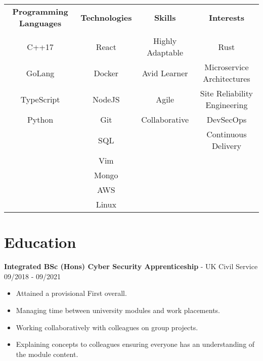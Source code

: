 \documentclass{article}
\begin{document}
\begin{center}
\begin{tabular}{ c | c | c | c } 
	\textbf{Programming Languages} & \textbf{Technologies} & \textbf{Skills}  & \textbf{Interests}           \\

	                               &                       &                  &                              \\
	C++17                          & React                 & Highly Adaptable & Rust                         \\
	GoLang                         & Docker                & Avid Learner     & Microservice Architectures   \\
	TypeScript                     & NodeJS                & Agile            & Site Reliability Engineering \\
	Python                         & Git                   & Collaborative    & DevSecOps                    \\
	                               & SQL                   &                  & Continuous Delivery          \\
	                               & Vim                   &                  &                              \\
	                               & Mongo                 &                  &                              \\
	                               & AWS                   &                  &                              \\
	                               & Linux                 &                  &                              \\

\end{tabular}
\end{center}

\section*{Education}

\textbf{Integrated BSc (Hons) Cyber Security Apprenticeship} - UK Civil Service \hfill 09/2018 - 09/2021

\begin{multicols}{2}
\begin{itemize}
\itemsep0em
	\item Attained a provisional First overall.
	\item Managing time between university modules and work placements.
	\item Working collaboratively with colleagues on group projects.
	\item Explaining concepts to colleagues ensuring everyone has an understanding of the module content.
\end{itemize}
\end{multicols}
\end{document}
